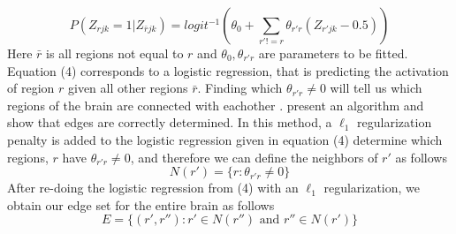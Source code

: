 \documentclass[12pt]{article}
\begin{document}
\begin{equation}P(Z_{rjk} = 1 | Z_{\bar{r}jk}) = logit^{-1}(\theta_0 + \sum_{r' != r}\theta_{r'r}(Z_{r'jk}-0.5))\end{equation}
Here $\bar{r}$ is all regions not equal to $r$ and $\theta_0, \theta_{r'r}$ are parameters to be fitted.  Equation (4) corresponds to a logistic regression, that is predicting the activation of region $r$ given all other regions $\bar{r}$. Finding which $\theta_{r'r} \neq 0$ will tell us which regions of the brain are connected with eachother \cite{kindermann1980markov}.  \cite{ravikumar2010high} present an algorithm and show that edges are correctly determined.  In this method, a $\ell_1$ regularization penalty is added to the logistic regression given in equation (4) determine which regions, $r$ have $\theta_{r'r} \neq 0$, and therefore we can define the neighbors of $r'$ as follows \begin{equation}N(r') = \{r : \theta_{r'r} \neq 0\}\end{equation}
After re-doing the logistic regression from (4) with an $\ell_1$ regularization, we obtain our edge set for the entire brain as follows \begin{equation} E = \{(r', r'') : r' \in N(r'') \text{ and } r'' \in N(r')\} \end{equation}



\end{document}
